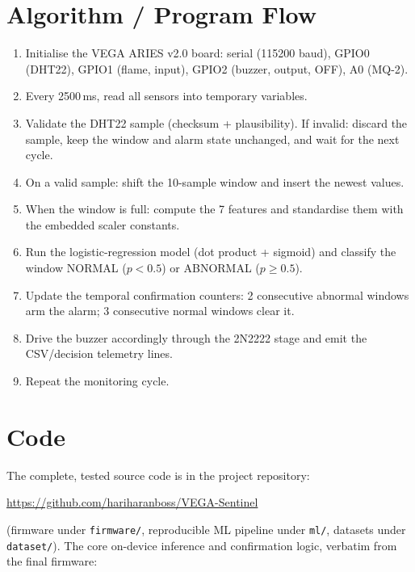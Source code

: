 \documentclass[11pt]{article}
\begin{document}
\section{Algorithm / Program Flow}
\begin{enumerate}[nosep]
  \item Initialise the VEGA ARIES v2.0 board: serial (115200 baud),
    GPIO0 (DHT22), GPIO1 (flame, input), GPIO2 (buzzer, output,
    OFF), A0 (MQ-2).
  \item Every 2500\,ms, read all sensors into temporary variables.
  \item Validate the DHT22 sample (checksum + plausibility). If
    invalid: discard the sample, keep the window and alarm state
    unchanged, and wait for the next cycle.
  \item On a valid sample: shift the 10-sample window and insert the
    newest values.
  \item When the window is full: compute the 7 features and standardise
    them with the embedded scaler constants.
  \item Run the logistic-regression model (dot product + sigmoid) and
    classify the window NORMAL ($p<0.5$) or ABNORMAL ($p \geq 0.5$).
  \item Update the temporal confirmation counters: 2 consecutive
    abnormal windows arm the alarm; 3 consecutive normal windows
    clear it.
  \item Drive the buzzer accordingly through the 2N2222 stage and emit
    the CSV/decision telemetry lines.
  \item Repeat the monitoring cycle.
\end{enumerate}

\section{Code}
The complete, tested source code is in the project repository:
\begin{center}
  \url{https://github.com/hariharanboss/VEGA-Sentinel}
\end{center}
(firmware under \texttt{firmware/}, reproducible ML pipeline under
\texttt{ml/}, datasets under \texttt{dataset/}). The core on-device
inference and confirmation logic, verbatim from the final firmware:
\end{document}
